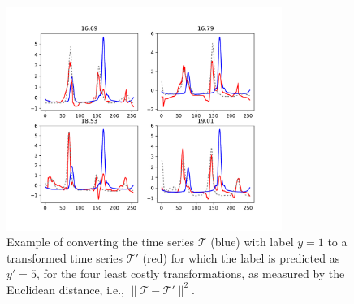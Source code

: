 \documentclass[smallextended,natbib]{svjour3}
\begin{document}
\begin{figure}
    \centering
    \includegraphics[width=0.8\textwidth]{figure/greedy/example2.pdf}
    \caption{Example of converting the time series $\mathcal{T}$ (blue) with label $y=1$ to a transformed time series $\mathcal{T}'$ (red) for which the label is predicted as $y'=5$, for the four least costly transformations, as measured by the Euclidean distance, i.e., $\lVert \mathcal{T} - \mathcal{T}'\rVert^2$.}
    \label{fig:greedy:example:2}
\end{figure}



 

\end{document}
